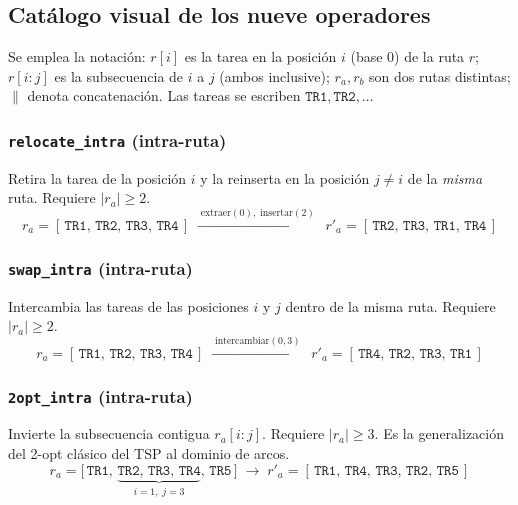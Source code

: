 \subsection{Catálogo visual de los nueve operadores}
\label{subsec:catalogo-operadores}

Se emplea la notación: $r[i]$ es la tarea en la posición $i$ (base 0) de la
ruta $r$; $r[i{:}j]$ es la subsecuencia de $i$ a $j$ (ambos inclusive);
$r_a, r_b$ son dos rutas distintas; $\|$ denota concatenación. Las tareas
se escriben $\mathtt{TR1}, \mathtt{TR2}, \dots$

\subsubsection{\texttt{relocate\_intra} (intra-ruta)}
Retira la tarea de la posición $i$ y la reinserta en la posición $j \neq i$
de la \emph{misma} ruta. Requiere $|r_a| \geq 2$.
\[
    r_a = [\,\mathtt{TR1},\, \mathtt{TR2},\, \mathtt{TR3},\, \mathtt{TR4}\,]
    \;\xrightarrow{\;\text{extraer}(0),\;\text{insertar}(2)\;}\;
    r'_a = [\,\mathtt{TR2},\, \mathtt{TR3},\, \mathtt{TR1},\, \mathtt{TR4}\,]
\]

\subsubsection{\texttt{swap\_intra} (intra-ruta)}
Intercambia las tareas de las posiciones $i$ y $j$ dentro de la misma ruta.
Requiere $|r_a| \geq 2$.
\[
    r_a = [\,\mathtt{TR1},\, \mathtt{TR2},\, \mathtt{TR3},\, \mathtt{TR4}\,]
    \;\xrightarrow{\;\text{intercambiar}(0,3)\;}\;
    r'_a = [\,\mathtt{TR4},\, \mathtt{TR2},\, \mathtt{TR3},\, \mathtt{TR1}\,]
\]

\subsubsection{\texttt{2opt\_intra} (intra-ruta)}
Invierte la subsecuencia contigua $r_a[i{:}j]$. Requiere $|r_a| \geq 3$. Es
la generalización del 2-opt clásico del TSP al dominio de arcos.
\[
    r_a = \bigl[\,\mathtt{TR1},\,
    \underbrace{\mathtt{TR2},\, \mathtt{TR3},\, \mathtt{TR4}}_{i=1,\;j=3},\,
    \mathtt{TR5}\,\bigr]
    \;\longrightarrow\;
    r'_a = [\,\mathtt{TR1},\, \mathtt{TR4},\, \mathtt{TR3},\, \mathtt{TR2},\, \mathtt{TR5}\,]
\]

